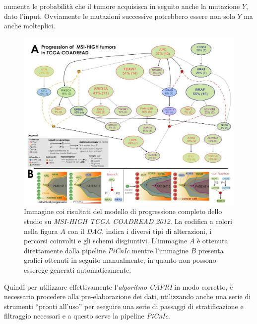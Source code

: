 \documentclass[a4paper,12pt, oneside]{book}
\begin{document}
aumenta le probabilità che il tumore acquisisca in seguito anche la mutazione
$Y$, dato l'input. Ovviamente le mutazioni successive potrebbero essere non
solo $Y$ ma anche molteplici.
\begin{figure}
  \centering
  \includegraphics[scale = 0.35]{img/resc.jpg}
  \caption{Immagine coi risultati del modello di progressione completo dello
    studio su \textit{MSI-HIGH TCGA COADREAD 2012}. La codifica a colori nella
    figura $A$ con il \textit{DAG}, indica
    i diversi tipi di alterazioni, i percorsi coinvolti e gli schemi
    disgiuntivi. L'immagine $A$ è ottenuta direttamente dalla pipeline
    \textit{PiCnIc} mentre l'immagine $B$ presenta grafici ottenuti in seguito
    manualmente, in quanto non possono esserege generati automaticamente. }
\end{figure}
Quindi per utilizzare effettivamente l'\textit{algoritmo CAPRI} in modo
corretto, è necessario procedere alla pre-elaborazione dei dati, utilizzando
anche una serie di strumenti ``pronti all'uso'' per eseguire una serie di
passaggi di stratificazione e filtraggio necessari e a questo serve la pipeline
\textit{PiCnIc}.  
\end{document}
